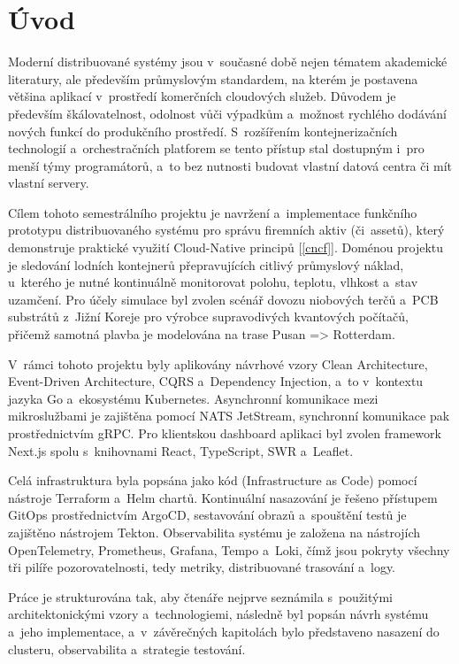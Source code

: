 \documentclass[11pt, a4paper, oneside]{article}
\begin{document}
\clearpage
\section{Úvod}

Moderní distribuované systémy jsou v~současné době nejen tématem akademické literatury, ale především průmyslovým standardem, na kterém je postavena většina aplikací v~prostředí komerčních cloudových služeb. Důvodem je především škálovatelnost, odolnost vůči výpadkům a~možnost rychlého dodávání nových funkcí do produkčního prostředí. S~rozšířením kontejnerizačních technologií a~orchestračních platforem se tento přístup stal dostupným i~pro menší týmy programátorů, a~to bez nutnosti budovat vlastní datová centra či mít vlastní servery.

Cílem tohoto semestrálního projektu je navržení a~implementace funkčního prototypu distribuovaného systému pro správu firemních aktiv (či~assetů), který demonstruje praktické využití Cloud-Native principů [\ref{cncf}]. Doménou projektu je sledování lodních kontejnerů přepravujících citlivý průmyslový náklad, u~kterého je nutné kontinuálně monitorovat polohu, teplotu, vlhkost a~stav uzamčení. Pro účely simulace byl zvolen scénář dovozu niobových terčů a~PCB substrátů z~Jižní Koreje pro výrobce supravodivých kvantových počítačů, přičemž samotná plavba je modelována na trase Pusan => Rotterdam.

V~rámci tohoto projektu byly aplikovány návrhové vzory Clean Architecture, Event-Driven Architecture, CQRS a~Dependency Injection, a~to v~kontextu jazyka Go a~ekosystému Kubernetes. Asynchronní komunikace mezi mikroslužbami je zajištěna pomocí NATS JetStream, synchronní komunikace pak prostřednictvím gRPC. Pro klientskou dashboard aplikaci byl zvolen framework Next.js spolu s~knihovnami React, TypeScript, SWR a~Leaflet.

Celá infrastruktura byla popsána jako kód (Infrastructure as Code) pomocí nástroje Terraform a~Helm chartů. Kontinuální nasazování je řešeno přístupem GitOps prostřednictvím ArgoCD, sestavování obrazů a~spouštění testů je zajištěno nástrojem Tekton. Observabilita systému je založena na nástrojích OpenTelemetry, Prometheus, Grafana, Tempo a~Loki, čímž jsou pokryty všechny tři pilíře pozorovatelnosti, tedy metriky, distribuované trasování a~logy.

Práce je strukturována tak, aby čtenáře nejprve seznámila s~použitými architektonickými vzory a~technologiemi, následně byl popsán návrh systému a~jeho implementace, a~v~závěrečných kapitolách bylo představeno nasazení do clusteru, observabilita a~strategie testování.
\end{document}
